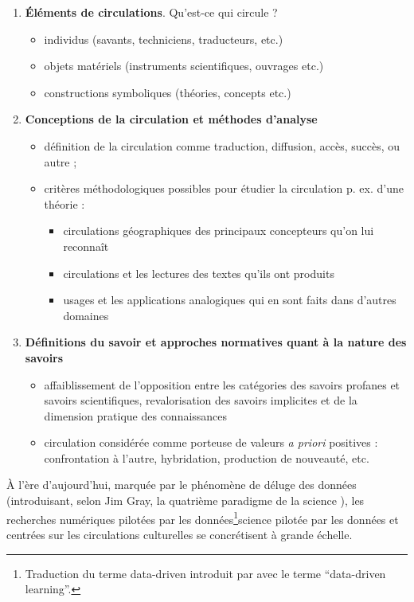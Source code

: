 \begin{enumerate}
    \item \textbf{Éléments de circulations}. Qu’est-ce qui circule ? 
    \begin{itemize}
        \item individus (savants, techniciens, traducteurs, etc.)
        \item objets matériels (instruments scientifiques, ouvrages etc.)
        \item constructions symboliques (théories, concepts etc.)
    \end{itemize}  
    \item \textbf{Conceptions de la circulation et méthodes d’analyse}
    \begin{itemize}
        \item définition de la circulation comme \og{}traduction\fg{}, \og{}diffusion\fg{}, \og{}accès\fg{}, \og{}succès\fg{}, ou autre ;
        \item critères méthodologiques possibles pour étudier la circulation p. ex. d’une théorie : 
        \begin{itemize}
            \item circulations géographiques des principaux concepteurs qu’on lui reconnaît
            \item circulations et les lectures des textes qu’ils ont produits  
            \item usages et les applications analogiques qui en sont faits dans d’autres domaines
        \end{itemize} 
    \end{itemize}
    \item \textbf{Définitions du savoir et approches normatives quant à la nature des savoirs}
    \begin{itemize}
        \item affaiblissement de l'opposition entre les catégories des \og{}savoirs profanes\fg{} et \og{}savoirs scientifiques\fg{},  revalorisation des savoirs implicites et de la dimension pratique des connaissances
        \item circulation considérée comme porteuse de valeurs \textit{a priori} positives : confrontation à l’autre, hybridation, production de nouveauté, etc.
    \end{itemize}
\end{enumerate}

À l'ère d'aujourd'hui, marquée par le phénomène de \og{}déluge des données\fg{} (introduisant, selon Jim Gray, la quatrième paradigme de la science \citep{hey2009jim}), les recherches numériques \og{}pilotées par les données\fg{}\footnote{Traduction du terme \og{}data-driven\fg{} introduit par \citep{Johns1991ShouldYB} avec le terme ``data-driven learning''.}\og{}science pilotée par les données\fg{} et centrées sur les circulations culturelles se concrétisent à grande échelle.

